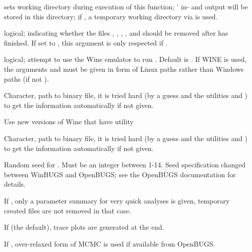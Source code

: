 \begin{Arguments}
\begin{ldescription}
\item[\code{working.directory}] sets working directory during execution of
this function; ' in- and output will be stored in this
directory; if , a temporary working directory via
 is used.
\item[\code{clearWD}] logical; indicating whether the files ,
, , ,
and  should be removed after  has
finished.  If set to , this argument is only respected if
.
\item[\code{useWINE}] logical; attempt to use the Wine emulator to run
. Default is . If WINE is used, the arguments  and  must be given in form of Linux paths
rather than Windows paths (if not ).
\item[\code{WINE}] Character, path to  binary file, it is
tried hard (by a guess and the utilities  and )
to get the information automatically if not given.
\item[\code{newWINE}] Use new versions of Wine that have 
utility
\item[\code{WINEPATH}] Character, path to  binary file, it is
tried hard (by a guess and the utilities  and )
to get the information automatically if not given.
\item[\code{bugs.seed}] Random seed for .  Must be an integer between 1-14.  Seed
specification changed between WinBUGS and OpenBUGS;  see the OpenBUGS documentation for
details.
\item[\code{summary.only}] If , only a parameter summary for very quick analyses is given,
temporary created files are not removed in that case.
\item[\code{save.history}] If  (the default), trace plots are generated at the end.
\item[\code{over.relax}] If , over-relaxed form of MCMC is used if available from OpenBUGS.
\end{ldescription}
\end{Arguments}
%
